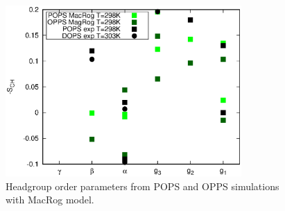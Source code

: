 \documentclass[aps,prl,superscriptaddress,twocolumn]{revtex4}
\begin{document}
\begin{figure}[]
  \centering
  \includegraphics[width=9.0cm]{../Figs/HGorderparametersPOPSvsOPPS.eps}
  \caption{\label{CHANGESwithCaClPGPS}
    Headgroup order parameters from POPS and OPPS simulations with MacRog model.}
\end{figure}
\end{document}
